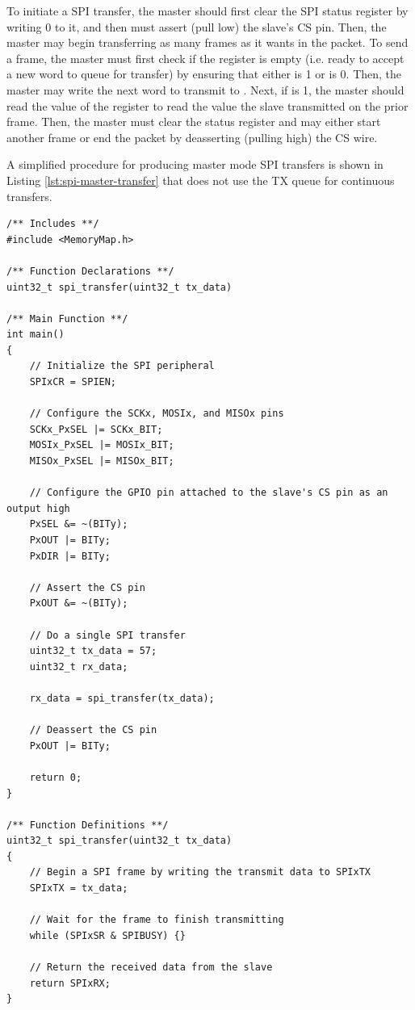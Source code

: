 To initiate a SPI transfer, the master should first clear the SPI status register  by writing 0 to it, and then must assert (pull low) the slave's CS pin. Then, the master may begin transferring as many frames as it wants in the packet. To send a frame, the master must first check if the  register is empty (i.e. ready to accept a new word to queue for transfer) by ensuring that either  is 1 or  is 0. Then, the master may write the next word to transmit to . Next, if  is 1, the master should read the value of the  register to read the value the slave transmitted on the prior frame. Then, the master must clear the status register and may either start another frame or end the packet by deasserting (pulling high) the CS wire.

A simplified procedure for producing master mode SPI transfers is shown in Listing \ref{lst:spi-master-transfer} that does not use the TX queue for continuous transfers.

\begin{lstlisting}[style=customC, label=lst:spi-master-transfer, caption={Example Program for SPI Master Transfers}]
/** Includes **/
#include <MemoryMap.h>

/** Function Declarations **/
uint32_t spi_transfer(uint32_t tx_data)

/** Main Function **/
int main()
{
	// Initialize the SPI peripheral
	SPIxCR = SPIEN;

	// Configure the SCKx, MOSIx, and MISOx pins
	SCKx_PxSEL |= SCKx_BIT;
	MOSIx_PxSEL |= MOSIx_BIT;
	MISOx_PxSEL |= MISOx_BIT;

	// Configure the GPIO pin attached to the slave's CS pin as an output high
	PxSEL &= ~(BITy);
	PxOUT |= BITy;
	PxDIR |= BITy;
	
	// Assert the CS pin
	PxOUT &= ~(BITy);

	// Do a single SPI transfer
	uint32_t tx_data = 57;
	uint32_t rx_data;
	
	rx_data = spi_transfer(tx_data);

	// Deassert the CS pin
	PxOUT |= BITy;

	return 0;
}

/** Function Definitions **/
uint32_t spi_transfer(uint32_t tx_data)
{
	// Begin a SPI frame by writing the transmit data to SPIxTX
	SPIxTX = tx_data;

	// Wait for the frame to finish transmitting
	while (SPIxSR & SPIBUSY) {}

	// Return the received data from the slave
	return SPIxRX;
}
\end{lstlisting}



